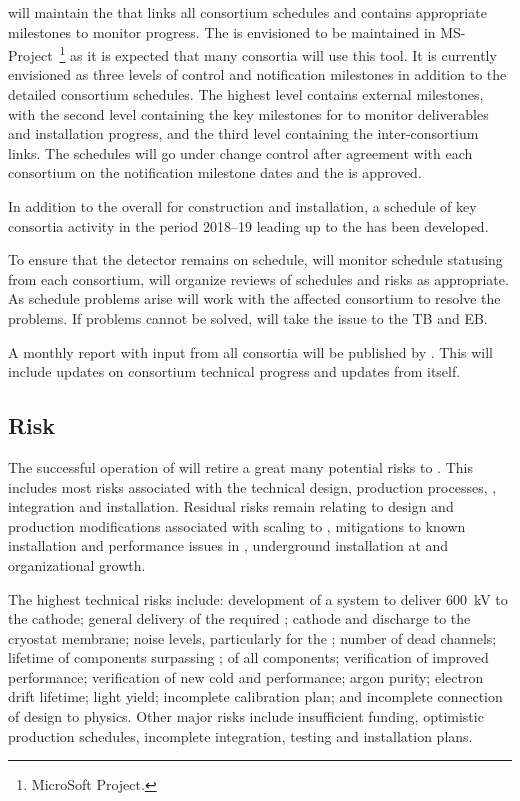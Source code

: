  will maintain the  that links all consortium schedules
and contains appropriate milestones to monitor progress. The 
is envisioned to be maintained in MS-Project~\footnote{MicroSoft\texttrademark{} Project.} as it is expected
that many consortia will use this tool. It is currently envisioned as
three levels of control and notification milestones in addition to the
detailed consortium schedules. The highest level contains external
milestones, with the second level containing the key milestones for 
to monitor deliverables and installation progress, and the third level
containing the inter-consortium links. The schedules will go
under change control after agreement with each consortium on the
notification milestone dates and the  is approved.

In addition to the overall  for construction and
installation, a schedule of key consortia activity in the period
2018--19 leading up to the  has been developed.

To ensure that the  detector remains on schedule,
 will monitor schedule statusing from each consortium, will organize
reviews of schedules and risks as appropriate.  As schedule problems
arise  will work with the affected consortium to resolve the
problems. If problems cannot be solved,  will take the issue to the
TB and EB.

A monthly report with input from all consortia will be published by
. This will include updates on consortium technical progress and
updates from  itself.


\subsection{Risk}
\label{sec:fdsp-coord-risk}

The successful operation of  will retire a great many
potential risks to . This includes most risks associated with the
technical design, production processes, , integration
and installation. Residual risks remain relating to design and
production modifications associated with scaling to , mitigations
to known installation and performance issues in , underground
installation at \surf and organizational growth.

The highest technical risks include: development of a system to
deliver \SI{600}{kV} to the \dual cathode; general delivery of the
required ; cathode and  discharge to the cryostat
membrane; noise levels, particularly for the ; %
number of dead channels; lifetime of components surpassing \dunelifetime{}; %
 of all components; verification of improved 
performance; verification of new cold   and   performance;
argon purity; electron drift lifetime; \phel light yield;
incomplete calibration plan; and incomplete connection of design to
physics. Other major risks include insufficient funding, optimistic
production schedules, incomplete integration, testing and installation
plans.

